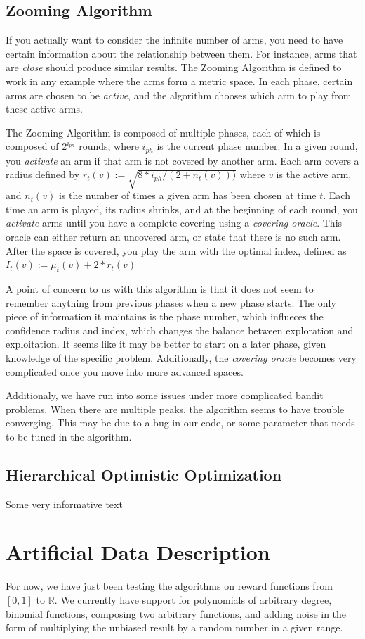 \documentclass{article}
\begin{document}
\subsection{Zooming Algorithm}
If you actually want to consider the infinite number of arms, you need to have certain information about the relationship between them. For instance, arms that are \emph{close} should produce similar results. The Zooming Algorithm is defined to work in any example where the arms form a metric space. In each phase, certain arms are chosen to be \emph{active}, and the algorithm chooses which arm to play from these active arms.

The Zooming Algorithm is composed of multiple phases, each of which is composed of $2^{i_{ph}}$ rounds, where $i_{ph}$ is the current phase number. In a given round, you \emph{activate} an arm if that arm is not covered by another arm. Each arm covers a radius defined by $r_t(v):=\sqrt{8*i_{ph}/(2+n_t(v)))}$ where $v$ is the active arm, and $n_t(v)$ is the number of times a given arm has been chosen at time $t$. Each time an arm is played, its radius shrinks, and at the beginning of each round, you \emph{activate} arms until you have a complete covering using a \emph{covering oracle}. This oracle can either return an uncovered arm, or state that there is no such arm. After the space is covered, you play the arm with the optimal index, defined as $I_t(v):=\mu_t(v)+2*r_t(v)$

A point of concern to us with this algorithm is that it does not seem to remember anything from previous phases when a new phase starts. The only piece of information it maintains is the phase number, which influeces the confidence radius and index, which changes the balance between exploration and exploitation. It seems like it may be better to start on a later phase, given knowledge of the specific problem. Additionally, the \emph{covering oracle} becomes very complicated once you move into more advanced spaces.

Additionaly, we have run into some issues under more complicated bandit problems. When there are multiple peaks, the algorithm seems to have trouble converging. This may be due to a bug in our code, or some parameter that needs to be tuned in the algorithm.
\subsection{Hierarchical Optimistic Optimization}
Some very informative text

\section{Artificial Data Description}
For now, we have just been testing the algorithms on reward functions from
$[0,1]$ to $\mathbb{R}$.  We currently have support for polynomials
of arbitrary degree, binomial functions, composing two arbitrary functions,
and adding noise in the form of multiplying the unbiased result by a random
number in a given range.
\\
\end{document}

